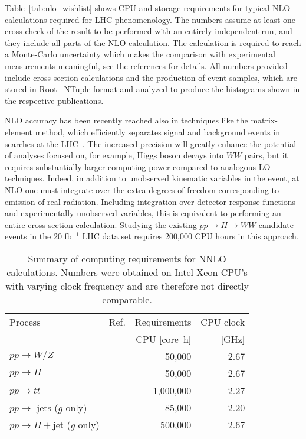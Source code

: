 \documentclass[12pt]{article}
\newcommand{\registered}{\textsuperscript{\textregistered}\xspace}
\begin{document}
Table~\ref{tab:nlo_wishlist} shows CPU and storage requirements for 
typical NLO calculations required for LHC phenomenology. The numbers assume
at least one cross-check of the result to be performed with an entirely
independent run, and they include all parts of the NLO calculation.
The calculation is required to reach a Monte-Carlo uncertainty which makes 
the comparison with experimental measurements meaningful, see the
references for details. All numbers provided include cross section
calculations and the production of event samples, which are stored
in Root~\cite{Brun:1997pa} NTuple format and analyzed to produce the
histograms shown in the respective publications.

NLO accuracy has been recently reached also in techniques like the 
matrix-element method, which efficiently separates signal and background
events in searches at the LHC~\cite{Campbell:2012cz}.
The increased precision will greatly enhance the potential of analyses
focused on, for example, Higgs boson decays into $WW$ pairs, 
but it requires substantially larger computing power compared
to analogous LO techniques. Indeed, in addition to unobserved kinematic 
variables in the event, at NLO one must integrate over the extra degrees 
of freedom corresponding to emission of real radiation. 
Including integration over detector response functions and experimentally 
unobserved variables, this is equivalent to performing an entire 
cross section calculation. Studying the existing $pp\to H\to WW$ 
candidate events in the 20 fb$^{-1}$ LHC data set requires 200,000 
CPU hours in this approach.

\begin{table}
  \centering
  \begin{tabular}{llrr}
    \hline
    Process & Ref. & Requirements & CPU clock\\
    & & CPU [core~h] & [GHz]\\
    \hline\hline
    $pp\to W/Z$ & \cite{Melnikov:2006di,Li:2012wna} & 50,000 & 2.67 \\
    $pp\to H$ & \cite{Anastasiou:2005qj} & 50,000 & 2.67 \\
    $pp\to t\bar{t}$ & \cite{Baernreuther:2012ws,Czakon:2013goa} & 1,000,000 & 2.27\\
    $pp\to $ jets ($g$ only) & \cite{Ridder:2013mf} & 85,000 & 2.20 \\
    $pp\to H+$jet ($g$ only) & \cite{Boughezal:2013uia} & 500,000 & 2.67 \\
    \hline
  \end{tabular}
  \caption{Summary of computing requirements for NNLO calculations.
    Numbers were obtained on Intel\registered Xeon\registered CPU's with
    varying clock frequency and are therefore not directly comparable.
    \label{tab:nnlo_requirements}}
\end{table}
\end{document}
